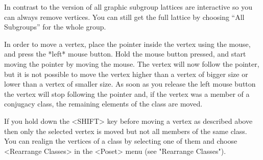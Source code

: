 In contrast to the {} version of {\XGAP} all graphic subgroup lattices 
are interactive so you can always remove vertices. You can still get the
full lattice by choosing ``All Subgroups'' for the whole group.

%







In order to move a vertex, place the  pointer inside the vertex using the
mouse, and press the *left* mouse button.  Hold the mouse button pressed,
and start moving  the pointer by moving  the mouse.  The  vertex will now
follow the pointer, but it is not possible to move the vertex higher than
a vertex  of bigger size  
or lower than a vertex of smaller
size.
As soon as you release the left mouse
button the vertex will stop following the pointer  and, if the vertex was
a member of a  conjugacy class, the remaining elements  of the class  are
moved.

If you hold  down  the <SHIFT> key before  moving  a vertex as  described
above then  only the selected vertex is moved but not all members of the
same class. You can realign the vertices of a class by selecting one of
them and choose <Rearrange Classes> in the <Poset> menu 
(see "Rearrange Classes").

